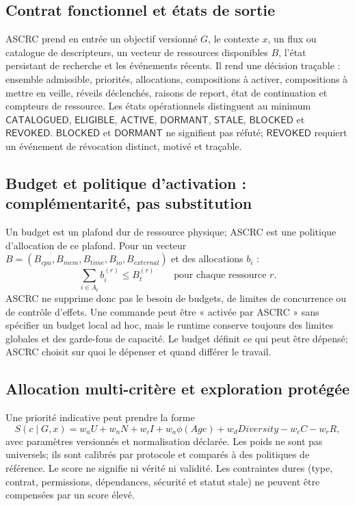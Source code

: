 \documentclass[11pt,a4paper]{article}
\theoremstyle{definition}
\theoremstyle{plain}
\theoremstyle{remark}
\begin{document}
\subsection{Contrat fonctionnel et états de sortie}
ASCRC prend en entrée un objectif versionné $G$, le contexte $x$, un flux ou catalogue de descripteurs, un vecteur de ressources disponibles $B$, l'état persistant de recherche et les événements récents. Il rend une décision traçable : ensemble admissible, priorités, allocations, compositions à activer, compositions à mettre en veille, réveils déclenchés, raisons de report, état de continuation et compteurs de ressource. Les états opérationnels distinguent au minimum $\mathsf{CATALOGUED}$, $\mathsf{ELIGIBLE}$, $\mathsf{ACTIVE}$, $\mathsf{DORMANT}$, $\mathsf{STALE}$, $\mathsf{BLOCKED}$ et $\mathsf{REVOKED}$. $\mathsf{BLOCKED}$ et $\mathsf{DORMANT}$ ne signifient pas réfuté; $\mathsf{REVOKED}$ requiert un événement de révocation distinct, motivé et traçable.

\subsection{Budget et politique d'activation : complémentarité, pas substitution}
Un budget est un plafond dur de ressource physique; ASCRC est une politique d'allocation de ce plafond. Pour un vecteur $B=(B_{cpu},B_{mem},B_{time},B_{io},B_{external})$ et des allocations $b_i$ :
\[
 \sum_{i\in A_t} b_i^{(r)}\leq B_t^{(r)}\qquad\text{pour chaque ressource }r.
\]
ASCRC ne supprime donc pas le besoin de budgets, de limites de concurrence ou de contrôle d'effets. Une commande peut être « activée par ASCRC » sans spécifier un budget local ad hoc, mais le runtime conserve toujours des limites globales et des garde-fous de capacité. Le budget définit ce qui peut être dépensé; ASCRC choisit sur quoi le dépenser et quand différer le travail.

\subsection{Allocation multi-critère et exploration protégée}
Une priorité indicative peut prendre la forme
\[
 S(c\mid G,x)=w_uU+w_nN+w_iI+w_a\phi(Age)+w_dDiversity-w_cC-w_rR,
\]
avec paramètres versionnés et normalisation déclarée. Les poids ne sont pas universels; ils sont calibrés par protocole et comparés à des politiques de référence. Le score ne signifie ni vérité ni validité. Les contraintes dures (type, contrat, permissions, dépendances, sécurité et statut stale) ne peuvent être compensées par un score élevé.
\end{document}
